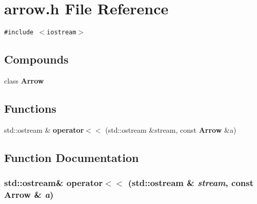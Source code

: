 \section{arrow.h File Reference}
\label{arrow_8h}
{\tt \#include $<$iostream$>$}\par
\subsection*{Compounds}
\begin{CompactItemize}
\item 
class {\bf Arrow}
\end{CompactItemize}
\subsection*{Functions}
\begin{CompactItemize}
\item 
std::ostream \& {\bf operator$<$$<$} (std::ostream \&stream, const {\bf Arrow} \&a)
\end{CompactItemize}


\subsection{Function Documentation}
\subsubsection{\setlength{\rightskip}{0pt plus 5cm}std::ostream\& operator$<$$<$ (std::ostream \& {\em stream}, const {\bf Arrow} \& {\em a})\hspace{0.3cm}{\tt  [inline]}}\label{arrow_8h_a0}


